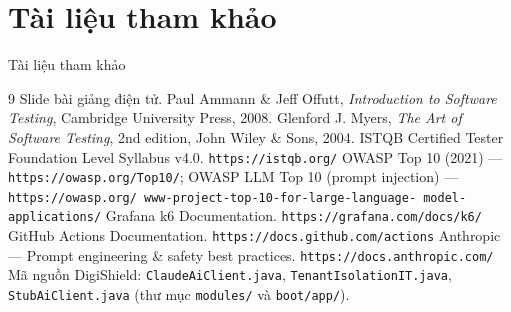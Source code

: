 \documentclass[aspectratio=169,12pt]{beamer}
\begin{document}
\section{Tài liệu tham khảo}

\begin{frame}{Tài liệu tham khảo}
  \vspace*{-0.4em}
  \scriptsize
  \begin{thebibliography}{9}
     Slide bài giảng điện tử.
     Paul Ammann \& Jeff Offutt, \emph{Introduction to Software
      Testing}, Cambridge University Press, 2008.
     Glenford J. Myers, \emph{The Art of Software Testing},
      2nd edition, John Wiley \& Sons, 2004.
     ISTQB Certified Tester Foundation Level Syllabus v4.0.
      \texttt{https://istqb.org/}
     OWASP Top 10 (2021) --- \texttt{https://owasp.org/Top10/};
      OWASP LLM Top 10 (prompt injection) --- \texttt{https://owasp.org/\allowbreak
      www-project-top-10-\allowbreak for-large-language-\allowbreak
      model-applications/}
     Grafana k6 Documentation. \texttt{https://grafana.com/docs/k6/}
     GitHub Actions Documentation.
      \texttt{https://docs.github.com/actions}
     Anthropic --- Prompt engineering \& safety best
      practices. \texttt{https://docs.anthropic.com/}
     Mã nguồn DigiShield: \texttt{ClaudeAiClient.java},
      \texttt{TenantIsolationIT.java}, \texttt{StubAiClient.java}
      (thư mục \texttt{modules/} và \texttt{boot/app/}).
  \end{thebibliography}
\end{frame}

\end{document}
